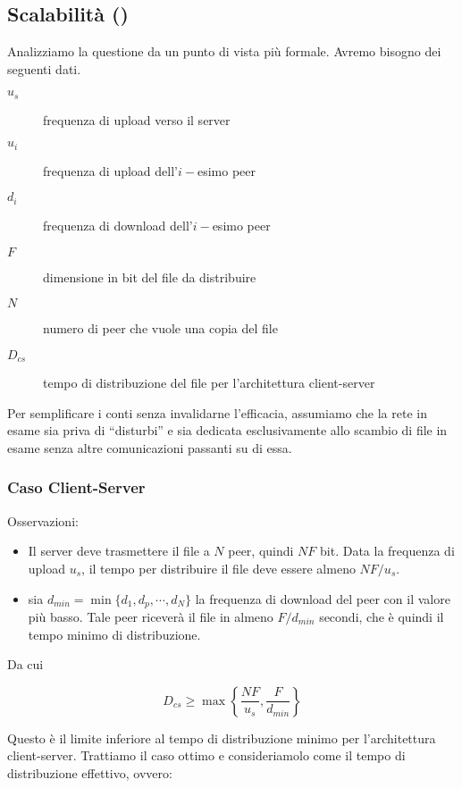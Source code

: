 \subsection{Scalabilità (\cite{kurose-ross})}\label{scalabilituxe0}

Analizziamo la questione da un punto di vista più formale. Avremo bisogno dei seguenti dati.

\begin{description}
\item[$u_s$]
frequenza di upload verso il server
\item[$u_i$]
frequenza di upload dell'$i-$esimo peer
\item[$d_i$]
frequenza di download dell'$i-$esimo peer
\item[$F$]
dimensione in bit del file da distribuire
\item[$N$]
numero di peer che vuole una copia del file
\item[$D_{cs}$]
tempo di distribuzione del file per l'architettura client-server
\end{description}

Per semplificare i conti senza invalidarne l'efficacia, assumiamo che la rete in esame sia priva di ``disturbi'' e sia dedicata esclusivamente allo scambio di file in esame senza altre comunicazioni passanti su di essa.

\subsubsection{Caso Client-Server}\label{caso-client-server}

Osservazioni:

\begin{itemize}
\item
  Il server deve trasmettere il file a $N$ peer, quindi $NF$ bit. Data   la frequenza di upload $u_s$, il tempo per distribuire il file deve   essere almeno $NF/u_s$.
\item
  sia $d_{min} = \min\{d_1,d_p,\cdots,d_N \}$ la frequenza di download   del peer con il valore più basso. Tale peer riceverà il file in almeno   $F/d_{min}$ secondi, che è quindi il tempo minimo di distribuzione.
\end{itemize}

Da cui

\[D_{cs} \geq \max \left\lbrace \frac{NF}{u_s}, \frac{F}{d_{min}} \right\rbrace\]

Questo è il limite inferiore al tempo di distribuzione minimo per l'architettura client-server. Trattiamo il caso ottimo e consideriamolo come il tempo di distribuzione effettivo, ovvero:

